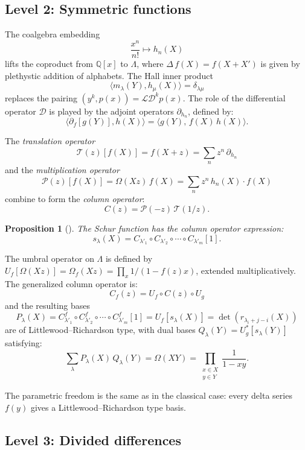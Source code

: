 \documentclass[11pt]{amsart}
\newtheorem{proposition}[theorem]{Proposition}
\theoremstyle{definition}
\newcommand{\Q}{\mathbb{Q}}
\newcommand{\cL}{\mathcal{L}}
\newcommand{\cD}{\mathcal{D}}
\newcommand{\cT}{\mathcal{T}}
\newcommand{\cP}{\mathcal{P}}
\begin{document}
\subsection{Level 2: Symmetric functions}\label{sec:symmetric}

The coalgebra embedding
\[
  \frac{x^n}{n!} \mapsto h_n(X)
\]
lifts the coproduct from $\Q[x]$ to $\Lambda$, where
$\Delta\, f(X) = f(X + X')$ is given by plethystic addition of
alphabets. The Hall inner product
\[
  \langle m_\lambda(Y), h_\mu(X) \rangle = \delta_{\lambda\mu}
\]
replaces the pairing $(y^k, p(x)) = \cL \cD^k p(x)$. The role of
the differential operator $\cD$ is played by the adjoint operators
$\partial_{h_n}$, defined by:
\[
  \langle \partial_f[g(Y)], h(X) \rangle
  = \langle g(Y),\, f(X)\, h(X) \rangle.
\]

The \emph{translation operator}
\[
  \cT(z)[f(X)] = f(X + z) = \sum_n z^n\, \partial_{h_n}
\]
and the \emph{multiplication operator}
\[
  \cP(z)[f(X)] = \Omega(Xz)\, f(X) = \sum_n z^n\, h_n(X) \cdot f(X)
\]
combine to form the \emph{column operator}:
\[
  C(z) = \cP(-z)\, \cT(1/z).
\]

\begin{proposition}[{\cite[Prop.~1.4]{Langer}}]
  The Schur function has the column operator expression:
  \[
    s_\lambda(X) = C_{\lambda'_1} \circ C_{\lambda'_2} \circ \cdots
    \circ C_{\lambda'_m}[1].
  \]
\end{proposition}

The umbral operator on $\Lambda$ is defined by
$U_f[\Omega(Xz)] = \Omega_f(Xz) = \prod_x 1/(1 - f(z)x)$, extended
multiplicatively. The generalized column operator is:
\[
  C_f(z) = U_f \circ C(z) \circ U_g
\]
and the resulting bases
\[
  P_\lambda(X) = C^f_{\lambda'_1} \circ C^f_{\lambda'_2} \circ
  \cdots \circ C^f_{\lambda'_m}[1] = U_f[s_\lambda(X)]
  = \det(r_{\lambda_i + j - i}(X))
\]
are of Littlewood--Richardson type, with dual bases
$Q_\lambda(Y) = U_g^*[s_\lambda(Y)]$ satisfying:
\[
  \sum_\lambda P_\lambda(X)\, Q_\lambda(Y) = \Omega(XY)
  = \prod_{\substack{x \in X \\ y \in Y}} \frac{1}{1 - xy}.
\]

The parametric freedom is the same as in the classical case: every
delta series $f(y)$ gives a Littlewood--Richardson type basis.

\subsection{Level 3: Divided differences}\label{sec:divided}
\end{document}
